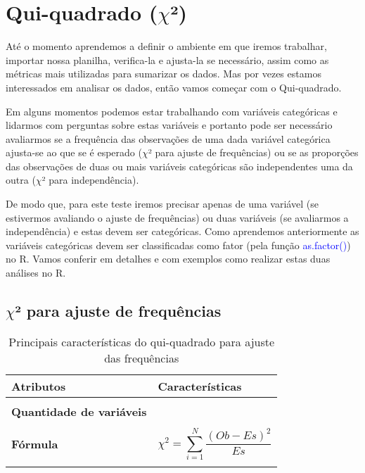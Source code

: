 \documentclass[14pt,titlepage, oneside, openany, a4paper]{book}
\begin{document}
\hypertarget{qui-quadrado-chi}{%
\chapter{\texorpdfstring{Qui-quadrado (\(\chi\)²)}{Qui-quadrado (\textbackslash{}chi²)}}\label{qui-quadrado-chi}}

Até o momento aprendemos a definir o ambiente em que iremos trabalhar, importar nossa planilha, verifica-la e ajusta-la se necessário, assim como as métricas mais utilizadas para sumarizar os dados. Mas por vezes estamos interessados em analisar os dados, então vamos começar com o Qui-quadrado.

Em alguns momentos podemos estar trabalhando com variáveis categóricas e lidarmos com perguntas sobre estas variáveis e portanto pode ser necessário avaliarmos se a frequência das observações de uma dada variável categórica ajusta-se ao que se é esperado (\(\chi\)² para ajuste de frequências) ou se as proporções das observações de duas ou mais variáveis categóricas são independentes uma da outra (\(\chi\)² para independência).

De modo que, para este teste iremos precisar apenas de uma variável (se estivermos avaliando o ajuste de frequências) ou duas variáveis (se avaliarmos a independência) e estas devem ser categóricas. Como aprendemos anteriormente as variáveis categóricas devem ser classificadas como fator (pela função \textcolor{blue}{as.factor()}) no R. Vamos conferir em detalhes e com exemplos como realizar estas duas análises no R.

\hypertarget{chi-para-ajuste-de-frequuxeancias}{%
\section{\texorpdfstring{\(\chi\)² para ajuste de frequências}{\textbackslash{}chi² para ajuste de frequências}}\label{chi-para-ajuste-de-frequuxeancias}}

\begin{table}

\caption{\label{tab:tab1qui}Principais características do qui-quadrado para ajuste das frequências}
\centering
\begin{tabular}[c]{>{\raggedright\arraybackslash}p{10em}>{\raggedright\arraybackslash}p{30em}}
\toprule
Atributos & Características\\
\midrule
\textbf{\cellcolor{gray!6}{Tipo de variável}} & \cellcolor{gray!6}{Categórica}\\
\textbf{Quantidade de variáveis} & 1\\
\textbf{\cellcolor{gray!6}{Hipótese nula}} & \cellcolor{gray!6}{O número de observações em cada grupo da variável é similar ao predito pela teoria}\\
\textbf{Fórmula} & $$\chi^2=\sum^{N}_{i = 1}\frac{(Ob-Es)^2}{Es}$$\\
\textbf{\cellcolor{gray!6}{Observação}} & \cellcolor{gray!6}{Se há apenas 2 categorias, dentro da variável, não há a necessidade de post-hoc nem expressa-la graficamente}\\
\bottomrule
\end{tabular}
\end{table}
\end{document}
